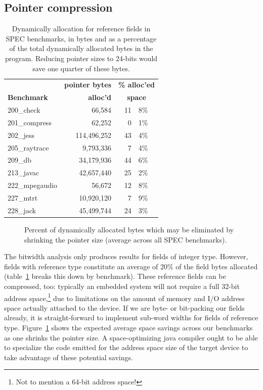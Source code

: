 \documentclass[preprint]{acmconf}
\begin{document}
\subsection{Pointer compression}\label{sec:ptrcmp}
\begin{table}
\begin{tabular}{lrr@{.}l}
&\multicolumn{1}{r}{\bf pointer bytes}&\multicolumn{2}{c}{\bf \% alloc'ed}\\
\bf Benchmark &\multicolumn{1}{r}{\bf alloc'd}&\multicolumn{2}{c}{\bf space} \\
\hline
200\_check	&     66,584 & 11&8\% \\
201\_compress	&     62,252 &  0&1\% \\
202\_jess	&114,496,252 & 43&4\% \\
205\_raytrace	&  9,793,336 &  7&4\% \\
209\_db 	& 34,179,936 & 44&6\% \\
213\_javac	& 42,657,440 & 25&2\% \\
222\_mpegaudio	&     56,672 & 12&8\% \\
227\_mtrt	& 10,920,120 &  7&9\% \\
228\_jack	& 45,499,744 & 24&3\% \\
\end{tabular}
\caption{Dynamically allocation for reference fields
in SPEC benchmarks, in bytes and as a percentage of the
total dynamically allocated bytes in the program.
Reducing pointer sizes to 24-bits would save one quarter
of these bytes.}
\label{tab:ptrtable}
\end{table}
\begin{figure}
\centering
\caption{Percent of dynamically allocated bytes which may be
  eliminated by shrinking the pointer size (average across all SPEC
  benchmarks).}
\label{fig:ptrsize}
\end{figure}
The bitwidth analysis only produces results for fields of integer type.
However, fields with reference type constitute an average of 20\% of
the field bytes allocated (table~\ref{tab:ptrtable} breaks this down
by benchmark).  These reference fields can be compressed, too:
typically an embedded system will not require a full 32-bit address
space,\footnote{Not to mention a 64-bit address space!} due to
limitations on the amount of memory and I/O address space actually attached
to the device.  If we are byte- or bit-packing our fields already,
it is straight-forward to implement sub-word widths for fields of
reference type.  Figure~\ref{fig:ptrsize} shows the expected average
space savings
across our benchmarks as one shrinks the pointer size.  A
space-optimizing java compiler ought to be able to specialize the code
emitted for the address space size of the target device to take
advantage of these potential savings.
\end{document}
